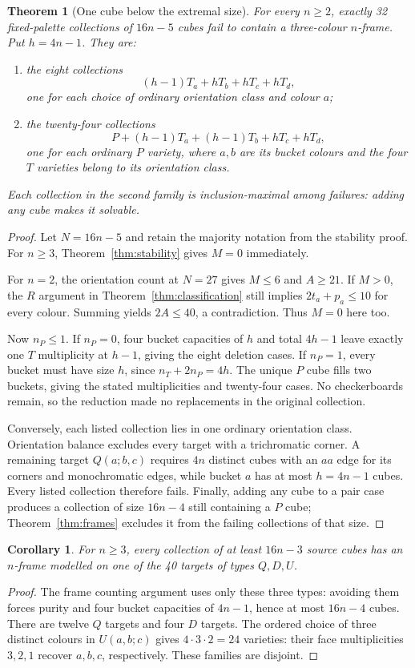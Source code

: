 \documentclass[11pt]{article}
\newtheorem{theorem}{Theorem}
\newtheorem{corollary}{Corollary}
\theoremstyle{remark}
\begin{document}
\begin{theorem}[One cube below the extremal size]\label{thm:near}
For every $n\ge2$, exactly 32 fixed-palette collections of $16n-5$ cubes
fail to contain a three-colour $n$-frame. Put $h=4n-1$. They are:
\begin{enumerate}
\item the eight collections
\[
 (h-1)T_a+hT_b+hT_c+hT_d,
\]
one for each choice of ordinary orientation class and colour $a$;
\item the twenty-four collections
\[
 P+(h-1)T_a+(h-1)T_b+hT_c+hT_d,
\]
one for each ordinary $P$ variety, where $a,b$ are its bucket colours
and the four $T$ varieties belong to its orientation class.
\end{enumerate}
Each collection in the second family is inclusion-maximal among failures:
adding any cube makes it solvable.
\end{theorem}
\begin{proof}
Let $N=16n-5$ and retain the majority notation from the stability proof.
For $n\ge3$, Theorem~\ref{thm:stability} gives $M=0$ immediately.

For $n=2$, the orientation count at $N=27$ gives $M\le6$ and $A\ge21$.
If $M>0$, the $R$ argument in Theorem~\ref{thm:classification} still
implies $2t_a+p_a\le10$ for every colour. Summing yields $2A\le40$,
a contradiction. Thus $M=0$ here too.

Now $n_P\le1$. If $n_P=0$, four bucket capacities of $h$ and total
$4h-1$ leave exactly one $T$ multiplicity at $h-1$, giving the eight
deletion cases. If $n_P=1$, every bucket must have size $h$, since
$n_T+2n_P=4h$. The unique $P$ cube fills two buckets, giving the stated
multiplicities and twenty-four cases. No checkerboards remain, so the
reduction made no replacements in the original collection.

Conversely, each listed collection lies in one ordinary orientation
class. Orientation balance excludes every target with a trichromatic
corner. A remaining target $Q(a;b,c)$ requires $4n$ distinct cubes with
an $aa$ edge for its corners and monochromatic edges, while bucket $a$
has at most $h=4n-1$ cubes. Every listed collection therefore fails.
Finally, adding any cube to a pair case produces a collection of size
$16n-4$ still containing a $P$ cube; Theorem~\ref{thm:frames} excludes it
from the failing collections of that size.
\end{proof}

\begin{corollary}\label{cor:frame-targets}
For $n\ge3$, every collection of at least $16n-3$ source cubes has an
$n$-frame modelled on one of the 40 targets of types $Q,D,U$.
\end{corollary}
\begin{proof}
The frame counting argument uses only these three types: avoiding them
forces purity and four bucket capacities of $4n-1$, hence at most
$16n-4$ cubes. There are twelve $Q$ targets and four $D$ targets.
The ordered choice of three distinct colours in $U(a,b;c)$ gives
$4\cdot3\cdot2=24$ varieties: their face multiplicities $3,2,1$
recover $a,b,c$, respectively. These families are disjoint.
\end{proof}
\end{document}
